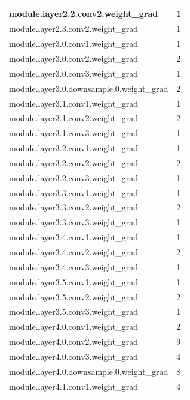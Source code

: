 \documentclass[12pt,letterpaper]{article}
\begin{document}
\begin{appendices}
\begin{longtable}{@{}ll@{}}
module.layer2.2.conv2.weight\_grad        & 1    \\ \midrule
module.layer2.3.conv2.weight\_grad        & 1    \\ \midrule
module.layer3.0.conv1.weight\_grad        & 1    \\ \midrule
module.layer3.0.conv2.weight\_grad        & 2    \\ \midrule
module.layer3.0.conv3.weight\_grad        & 1    \\ \midrule
module.layer3.0.downsample.0.weight\_grad & 2    \\ \midrule
module.layer3.1.conv1.weight\_grad        & 1    \\ \midrule
module.layer3.1.conv2.weight\_grad        & 2    \\ \midrule
module.layer3.1.conv3.weight\_grad        & 1    \\ \midrule
module.layer3.2.conv1.weight\_grad        & 1    \\ \midrule
module.layer3.2.conv2.weight\_grad        & 2    \\ \midrule
module.layer3.2.conv3.weight\_grad        & 1    \\ \midrule
module.layer3.3.conv1.weight\_grad        & 1    \\ \midrule
module.layer3.3.conv2.weight\_grad        & 2    \\ \midrule
module.layer3.3.conv3.weight\_grad        & 1    \\ \midrule
module.layer3.4.conv1.weight\_grad        & 1    \\ \midrule
module.layer3.4.conv2.weight\_grad        & 2    \\ \midrule
module.layer3.4.conv3.weight\_grad        & 1    \\ \midrule
module.layer3.5.conv1.weight\_grad        & 1    \\ \midrule
module.layer3.5.conv2.weight\_grad        & 2    \\ \midrule
module.layer3.5.conv3.weight\_grad        & 1    \\ \midrule
module.layer4.0.conv1.weight\_grad        & 2    \\ \midrule
module.layer4.0.conv2.weight\_grad        & 9    \\ \midrule
module.layer4.0.conv3.weight\_grad        & 4    \\ \midrule
module.layer4.0.downsample.0.weight\_grad & 8    \\ \midrule
module.layer4.1.conv1.weight\_grad        & 4    \\ \midrule

\end{longtable}
\end{appendices}
\end{document}
